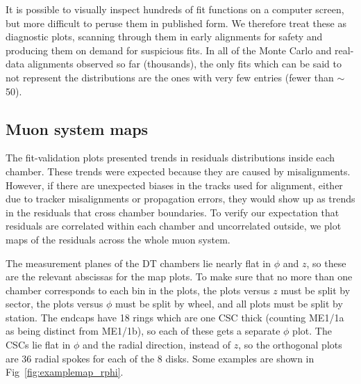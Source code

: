 \documentclass[12pt]{article}
\begin{document}
It is possible to visually inspect hundreds of fit functions on a
computer screen, but more difficult to peruse them in published form.
We therefore treat these as diagnostic plots, scanning through them in
early alignments for safety and producing them on demand for
suspicious fits.  In all of the Monte Carlo and real-data alignments
observed so far (thousands), the only fits which can be said to not
represent the distributions are the ones with very few entries (fewer
than $\sim$50).

\subsection{Muon system maps}

The fit-validation plots presented trends in residuals distributions
inside each chamber.  These trends were expected because they are
caused by misalignments.  However, if there are unexpected biases in
the tracks used for alignment, either due to tracker misalignments or
propagation errors, they would show up as trends in the residuals that
cross chamber boundaries.  To verify our expectation that residuals
are correlated within each chamber and uncorrelated outside, we plot
maps of the residuals across the whole muon system.

The measurement planes of the DT chambers lie nearly flat in $\phi$
and $z$, so these are the relevant abscissas for the map plots.  To
make sure that no more than one chamber corresponds to each bin in the
plots, the plots versus $z$ must be split by sector, the plots versus
$\phi$ must be split by wheel, and all plots must be split by station.
The endcaps have 18 rings which are one CSC thick (counting ME1/1a as
being distinct from ME1/1b), so each of these gets a separate $\phi$
plot.  The CSCs lie flat in $\phi$ and the radial direction, instead
of $z$, so the orthogonal plots are 36 radial spokes for each of the 8
disks.  Some examples are shown in Fig~\ref{fig:examplemap_rphi}.
\end{document}
